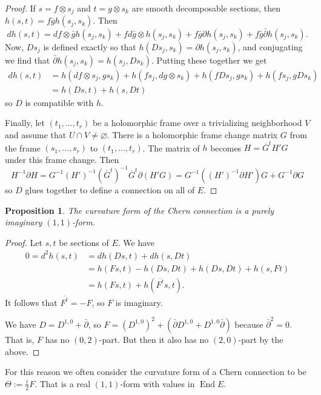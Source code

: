 \documentclass[11pt]{article}
\newtheorem{prop}[theo]{Proposition}
\newtheorem*{proof}{Proof}
\DeclareMathOperator{\End}{End}
\begin{document}
\begin{proof}
If $s = f \otimes s_j$ and $t = g \otimes s_k$ are smooth decomposable sections, then $h(s,t) = f\overline{g} h(s_j,s_k)$. Then
$$
d h(s,t)
= df \otimes \bar g h(s_j,s_k)
+ f d\bar g \otimes h(s_j,s_k)
+ f\bar g\partial h(s_j,s_k)
+ f\bar g\bar\partial h(s_j,s_k).
$$
Now, $Ds_j$ is defined exactly so that $h(Ds_j, s_k) = \partial h(s_j,s_k)$, and conjugating we find that $\bar\partial h(s_j,s_k) = h(s_j, D s_k)$. Putting these together we get
\begin{align*}
d h(s,t)
&= h(df \otimes s_j, g s_k)
+ h(f s_j, d g \otimes s_k)
+ h(f D s_j,g s_k)
+ h(f s_j,g D s_k)
\\
&= h(Ds, t) + h(s, Dt)
\end{align*}
so $D$ is compatible with $h$.

Finally, let $(t_1, \ldots, t_r)$ be a holomorphic frame over a trivializing neighborhood $V$ and assume that $U \cap V \not= \varnothing$. There is a holomorphic frame change matrix $G$ from the frame $(s_1, \ldots, s_r)$ to $(t_1,\ldots,t_r)$. The matrix of $h$ becomes $H = \overline{G}^{t}H'G$ under this frame change. Then
$$
H^{-1} \partial H
= G^{-1} (H')^{-1} (\overline G^t)^{-1} \overline G^t \partial(H'G)
= G^{-1} ((H')^{-1} \partial H') G + G^{-1} \partial G
$$
so $D$ glues together to define a connection on all of $E$.
\end{proof}


\begin{prop}
The curvature form of the Chern connection is a purely imaginary $(1,1)$-form.
\end{prop}

\begin{proof}
Let $s, t$ be sections of $E$. We have
\begin{align*}
0
= d^2 h(s, t)
&= d h(Ds, t) + d h(s, Dt)
\\
&= h(F s, t) - h(Ds, Dt) + h(Ds, Dt) + h(s, F t)
\\
&=
h(Fs,t) + h(\overline{F^{t}}s, t).
\end{align*}
It follows that $\overline{F^t} = -F$, so $F$ is imaginary.

We have $D = D^{1,0} + \bar\partial$, so $F = (D^{1,0})^2 + (\bar\partial D^{1,0} + D^{1,0}\bar\partial)$ because $\bar\partial^2 = 0$. That is, $F$ has no $(0,2)$-part. But then it also has no $(2,0)$-part by the above.
\end{proof}

For this reason we often consider the curvature form of a Chern connection to be $\Theta := \frac i2 F$. That is a real $(1,1)$-form with values in $\End E$.
\end{document}
